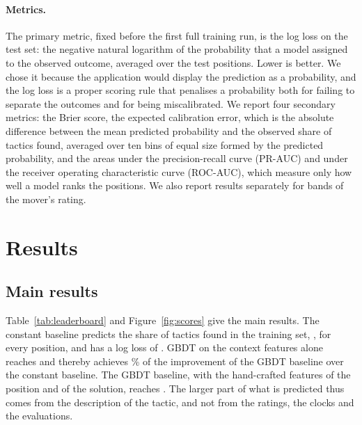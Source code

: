 \documentclass[11pt]{article}
\begin{document}
\paragraph{Metrics.}
The primary metric, fixed before the first full training run, is the log
loss on the test set: the negative natural logarithm of the probability that
a model assigned to the observed outcome, averaged over the test positions.
Lower is better. We chose it because the application would display the
prediction as a probability, and the log loss is a proper scoring rule that
penalises a probability both for failing to separate the outcomes and for
being miscalibrated. We report four secondary metrics: the Brier score, the
expected calibration error, which is the absolute difference between the
mean predicted probability and the observed share of tactics found, averaged
over ten bins of equal size formed by the predicted probability, and the
areas under the precision-recall curve (PR-AUC) and under the receiver
operating characteristic curve (ROC-AUC), which measure only how well a model
ranks the positions. We also report results separately for 
bands of the mover's rating.



\section{Results}
\label{sec:results}

\subsection{Main results}

Table~\ref{tab:leaderboard} and Figure~\ref{fig:scores} give the main
results. The constant baseline predicts the share of tactics found in the
training set, , for every position, and has a log loss of
. GBDT on the context features alone reaches
 and thereby achieves \% of
the improvement of the GBDT baseline over the constant baseline. The GBDT
baseline, with the hand-crafted features of the position and of the
solution, reaches . The larger part of what is predicted
thus comes from the description of the tactic, and not from the ratings, the
clocks and the evaluations.

\begin{table}[htbp]\centering\small
{}
\caption{Main results on the  test positions, best first.
The gain is the paired difference in log loss from  on the
same resampled games. It is positive when the model is better, and bold when
statistically significant.}
\label{tab:leaderboard}
\end{table}
\end{document}

